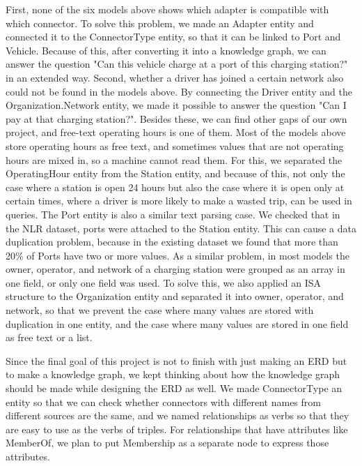 \documentclass[sigconf]{acmart}
\begin{document}
First, none of the six models above shows which adapter is compatible with which connector. To solve this problem, we made an Adapter entity and connected it to the ConnectorType entity, so that it can be linked to Port and Vehicle. Because of this, after converting it into a knowledge graph, we can answer the question "Can this vehicle charge at a port of this charging station?" in an extended way. Second, whether a driver has joined a certain network also could not be found in the models above. By connecting the Driver entity and the Organization.Network entity, we made it possible to answer the question "Can I pay at that charging station?". Besides these, we can find other gaps of our own project, and free-text operating hours is one of them. Most of the models above store operating hours as free text, and sometimes values that are not operating hours are mixed in, so a machine cannot read them. For this, we separated the OperatingHour entity from the Station entity, and because of this, not only the case where a station is open 24 hours but also the case where it is open only at certain times, where a driver is more likely to make a wasted trip, can be used in queries. The Port entity is also a similar text parsing case. We checked that in the NLR dataset, ports were attached to the Station entity. This can cause a data duplication problem, because in the existing dataset we found that more than 20\% of Ports have two or more values. As a similar problem, in most models the owner, operator, and network of a charging station were grouped as an array in one field, or only one field was used. To solve this, we also applied an ISA structure to the Organization entity and separated it into owner, operator, and network, so that we prevent the case where many values are stored with duplication in one entity, and the case where many values are stored in one field as free text or a list.

Since the final goal of this project is not to finish with just making an ERD but to make a knowledge graph, we kept thinking about how the knowledge graph should be made while designing the ERD as well. We made ConnectorType an entity so that we can check whether connectors with different names from different sources are the same, and we named relationships as verbs so that they are easy to use as the verbs of triples. For relationships that have attributes like MemberOf, we plan to put Membership as a separate node to express those attributes.
\end{document}
